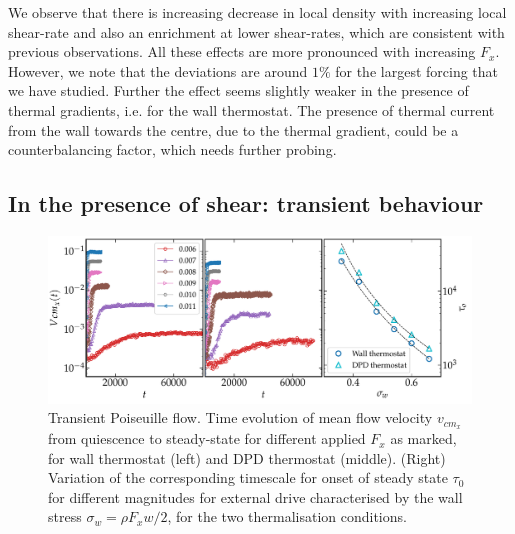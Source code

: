 We observe that there is increasing decrease in local density with increasing local shear-rate and also an enrichment at lower shear-rates, which are consistent with previous observations. All these effects are more pronounced with increasing $F_x$. However, we note that the deviations are around $1\%$ for the largest forcing that we have studied. Further the effect seems slightly weaker in the presence of thermal gradients, i.e. for the wall thermostat. The presence of thermal current from the wall towards the centre, due to the thermal gradient, could be a counterbalancing factor, which needs further probing.



\subsection{In the presence of shear: transient behaviour}

\begin{figure}
\centering
\includegraphics[width=15cm]{figs/vcmx.pdf}
\caption[{\em Transient Poiseuille flow: time evolution of mean flow velocity}]{Transient Poiseuille flow. Time evolution of mean flow velocity $v_{cm_x}$ from quiescence to steady-state for different applied $F_x$ as marked, for wall thermostat (left) and DPD thermostat (middle). (Right) Variation of the corresponding  timescale for onset of steady state $\tau_0$ for different magnitudes for external drive characterised by the wall stress $\sigma_w=\rho{F_x}w/2$, for the two thermalisation conditions.}
\label{onset}
\end{figure}

